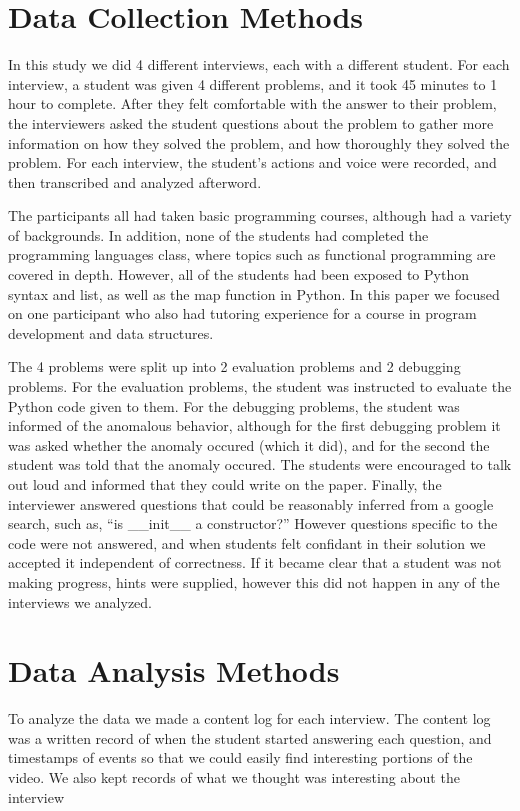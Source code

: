 \documentclass{article}
\begin{document}
\newpage
\section{Data Collection Methods}

In this study we did 4 different interviews, each with a different student.
For each interview, a student was given 4 different problems, and it took 45 minutes to 1 hour to complete.
After they felt comfortable with the answer to their problem,
 the interviewers asked the student questions about the problem to gather more information on how they solved the problem,
 and how thoroughly they solved the problem.
For each interview, the student's actions and voice were recorded, and then transcribed and analyzed afterword.

The participants all had taken basic programming courses, although had a variety of backgrounds.
In addition, none of the students had completed the programming languages class, where topics such as functional programming are covered in depth.
However, all of the students had been exposed to Python syntax and list, as well as the map function in Python.
In this paper we focused on one participant who also had tutoring experience for a course in program development and data structures.

The 4 problems were split up into 2 evaluation problems and 2 debugging problems.
For the evaluation problems, the student was instructed to evaluate the Python code given to them.
For the debugging problems, the student was informed of the anomalous behavior,
 although for the first debugging problem it was asked whether the anomaly occured (which it did),
 and for the second the student was told that the anomaly occured.
The students were encouraged to talk out loud and informed that they could write on the paper.
Finally, the interviewer answered questions that could be reasonably inferred from a google search, such as,
``is \_\_init\_\_ a constructor?''
However questions specific to the code were not answered, and when students felt confidant in their solution we accepted it independent of correctness.
If it became clear that a student was not making progress, hints were supplied, however this did not happen in any of the interviews we analyzed.


\newpage
\section{Data Analysis Methods}

To analyze the data we made a content log for each interview.
The content log was a written record of when the student started answering each question,
 and timestamps of events so that we could easily find interesting portions of the video.
We also kept records of what we thought was interesting about the interview 
\end{document}
